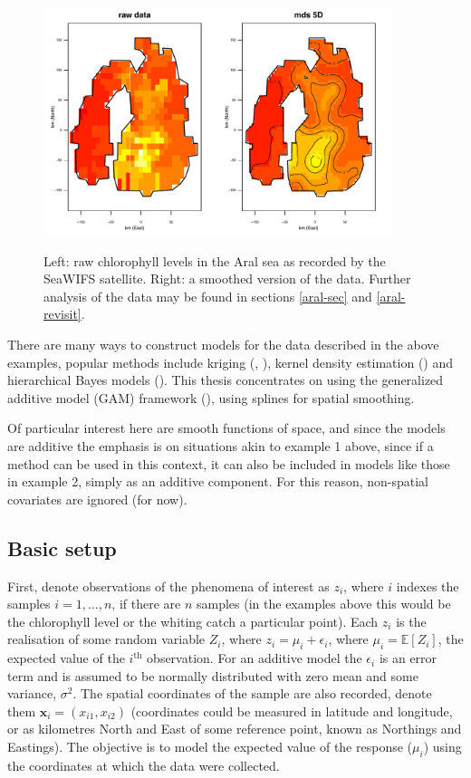 \begin{figure}[tb]
\centering
\includegraphics[width=4in, trim=0in 0in 0in 0.3in, clip]{mds/figs/aral-5d-duchon.pdf}\\
\caption{Left: raw chlorophyll levels in the Aral sea as recorded by the SeaWIFS satellite. Right: a smoothed version of the data. Further analysis of the data may be found in sections \ref{aral-sec} and \ref{aral-revisit}.}
\label{aral-intro}
\end{figure}

There are many ways to construct models for the data described in the above examples, popular methods include kriging (\cite{diggle},  \cite{schabenberger}), kernel density estimation (\cite{wandKDE}) and hierarchical Bayes models (\cite{banerjee}). This thesis concentrates on using the generalized additive model (GAM) framework (\cite{gammonograph}), using splines for spatial smoothing.

Of particular interest here are smooth functions of space, and since the models are additive the emphasis is on situations akin to example 1 above, since if a method can be used in this context, it can also be included in models like those in example 2, simply as an additive component. For this reason, non-spatial covariates are ignored (for now).

\subsection{Basic setup}

First, denote observations of the phenomena of interest as $z_i$, where $i$ indexes the samples $i=1,\ldots,n$, if there are $n$ samples (in the examples above this would be the chlorophyll level or the whiting catch a particular point). Each  $z_i$ is the realisation of some random variable $Z_i$, where $z_i=\mu_i+\epsilon_i$, where $\mu_i=\mathbb{E}[Z_i]$, the expected value of the $i^\text{th}$ observation. For an additive model the $\epsilon_i$ is an error term and is assumed to be normally distributed with zero mean and some variance, $\sigma^2$. The spatial coordinates of the sample are also recorded, denote them $\mathbf{x}_i = (x_{i1}, x_{i2})$ (coordinates could be measured in latitude and longitude, or as kilometres North and East of some reference point, known as Northings and Eastings). The objective is to model the expected value of the response ($\mu_i$) using the coordinates at which the data were collected.

